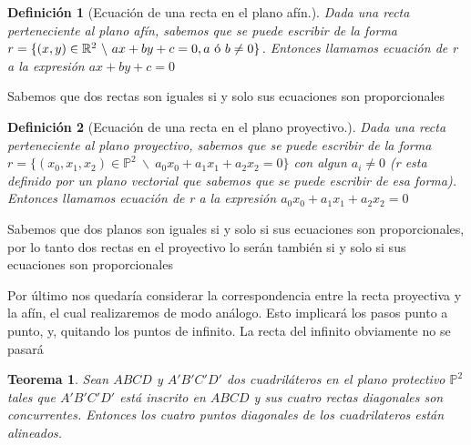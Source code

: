 \documentclass[11pt, a4paper]{article}
\newif\IfInSansMode
\theoremstyle{theorem-style}
\newtheorem{nth}{Teorema}[section]
\theoremstyle{definition-style}
\newtheorem{ndef}{Definición}[section]
\theoremstyle{remark-style}
\theoremstyle{example-style}
\begin{document}
\begin{ndef}[Ecuación de una recta en el plano afín.]
Dada una recta perteneciente al plano afín, sabemos que se puede escribir de la forma $r = \{(x,y) \in \mathbb{R}^2\ \backslash\ ax + by + c = 0, a \textup{ ó } b \neq 0\}$. Entonces llamamos ecuación de r a la expresión $ax + by + c = 0$ 
\end{ndef}
Sabemos que dos rectas son iguales si y solo sus ecuaciones son proporcionales

\begin{ndef}[Ecuación de una recta en el plano proyectivo.]
Dada una recta perteneciente al plano proyectivo, sabemos que se puede escribir de la forma $r = \{(x_0,x_1,x_2) \in \mathbb{P}^2\ \backslash\ a_0x_0+a_1x_1+a_2x_2 = 0\}$ con algun $a_i \neq 0$ (r esta definido por un plano vectorial que sabemos que se puede escribir de esa forma). Entonces llamamos ecuación de r a la expresión $a_0x_0+a_1x_1+a_2x_2 = 0$ 
\end{ndef}
Sabemos que dos planos son iguales si y solo si sus ecuaciones son proporcionales, por lo tanto dos rectas en el proyectivo lo serán también si y solo si sus ecuaciones son proporcionales

Por  último nos quedaría considerar la correspondencia entre la recta proyectiva y la afín, el cual realizaremos de modo análogo. Esto implicará los pasos punto a punto, y, quitando los puntos de infinito. La recta del infinito obviamente no se pasará

\begin{nth}
	Sean $ABCD$ y $A'B'C'D'$ dos cuadriláteros en el plano protectivo $\mathbb{P}^2$ tales que $A'B'C'D'$ está inscrito en $ABCD$ y sus cuatro rectas diagonales son concurrentes. Entonces  los cuatro puntos diagonales de los cuadrilateros están alineados.
\end{nth}
\end{document}

